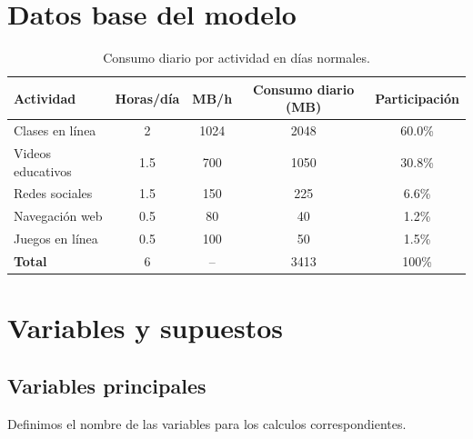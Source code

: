 \documentclass[12pt,a4paper]{article}
\begin{document}
\begin{center}
		
		\section{Datos base del modelo}
		
		\begin{table}[H]
			\centering
			\renewcommand{\arraystretch}{1.3}
			\begin{tabular}{|p{4.5cm}|c|c|c|c|}
				\hline
				\rowcolor{azulclaro}
				\textbf{Actividad} & \textbf{Horas/día} & \textbf{MB/h} & \textbf{Consumo diario (MB)} & \textbf{Participación} \\ \hline
				Clases en línea & 2 & 1024 & 2048 & 60.0\% \\ \hline
				Videos educativos & 1.5 & 700 & 1050 & 30.8\% \\ \hline
				Redes sociales & 1.5 & 150 & 225 & 6.6\% \\ \hline
				Navegación web & 0.5 & 80 & 40 & 1.2\% \\ \hline
				Juegos en línea & 0.5 & 100 & 50 & 1.5\% \\ \hline
				\rowcolor{gris}
				\textbf{Total} & 6 & -- & 3413 & 100\% \\ \hline
			\end{tabular}
			\caption{Consumo diario por actividad en días normales.}
		\end{table}
		
		\section{Variables y supuestos}
		
		\subsection{Variables principales}
		Definimos el nombre de las variables para los calculos correspondientes.
		

\end{center}
\end{document}
